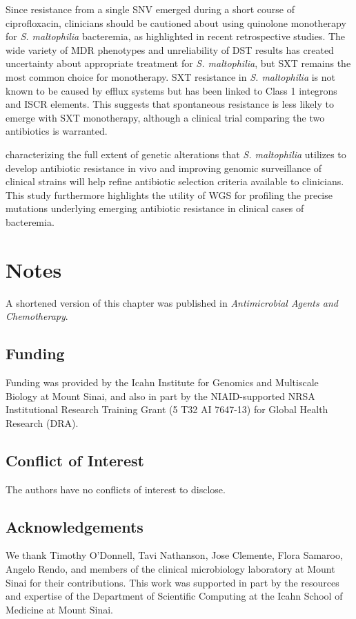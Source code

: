 Since resistance from a single SNV emerged during a short course of ciprofloxacin, clinicians should be cautioned about using quinolone monotherapy for \emph{S. maltophilia} bacteremia, as highlighted in recent retrospective studies.\autocite{Cho2014a,Wang2014} The wide variety of MDR phenotypes and unreliability of DST results has created uncertainty about appropriate treatment for \emph{S. maltophilia}, but SXT remains the most common choice for monotherapy.\autocite{Brooke2012,Cho2014a,Wang2014} SXT resistance in \emph{S. maltophilia} is not known to be caused by efflux systems but has been linked to Class 1 integrons and ISCR elements.\autocite{Brooke2012} This suggests that spontaneous resistance is less likely to emerge with SXT monotherapy, although a clinical trial comparing the two antibiotics is warranted.\autocite{Cho2014a,Wang2014}

 characterizing the full extent of genetic alterations that \emph{S. maltophilia} utilizes to develop antibiotic resistance in vivo and improving genomic surveillance of clinical strains will help refine antibiotic selection criteria available to clinicians. This study furthermore highlights the utility of WGS for profiling the precise mutations underlying emerging antibiotic resistance in clinical cases of bacteremia.

\section*{Notes}

A shortened version of this chapter was published in \textit{Antimicrobial Agents and Chemotherapy}.\autocite{Pak2015a}

\subsection{Funding}

Funding was provided by the Icahn Institute for Genomics and Multiscale Biology at Mount Sinai, and also in part by the NIAID-supported NRSA Institutional Research Training Grant (5 T32 AI 7647-13) for Global Health Research (DRA).

\subsection{Conflict of Interest}

The authors have no conflicts of interest to disclose.

\subsection{Acknowledgements}

We thank Timothy O’Donnell, Tavi Nathanson, Jose Clemente, Flora Samaroo, Angelo Rendo, and members of the clinical microbiology laboratory at Mount Sinai for their contributions. This work was supported in part by the resources and expertise of the Department of Scientific Computing at the Icahn School of Medicine at Mount Sinai.